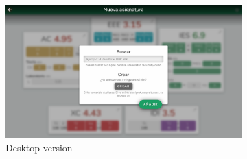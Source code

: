 \vfill
\begin{figure}[ht!]
    \begin{subfigure}[b]{0.757\textwidth-0.1cm}
        \centering
        \includegraphics[width=\textwidth]{media/screenshots/screenshot-search-empty-pc.png}
        \caption{Desktop version}
    \end{subfigure}
    \hfill
    \begin{subfigure}[b]{0.243\textwidth-0.1cm}
        \centering

\end{subfigure}
\end{figure}
